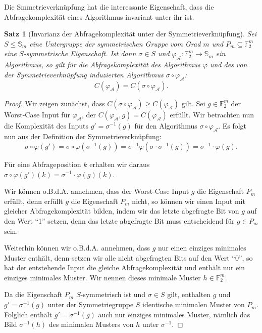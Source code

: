 \documentclass[10pt,a4paper, footheight=1mm]{scrreprt}
\newtheorem{Satz}[definition]{Satz}
\theoremstyle{definition}
\begin{document}
Die Smmetrieverknüpfung hat die interessante Eigenschaft,
dass die Abfragekomplexität eines Algorithmus invariant unter
ihr ist.

\begin{Satz}[Invarianz der Abfragekomplexität unter der Symmetrieverknüpfung]
Sei $S\leq \mathbb{S}_m$ eine Untergruppe der symmetrischen Gruppe vom
Grad $m$ und $P_m \subseteq\mathbb{F}_2^m$ eine $S$-symmetrische
Eigenschaft. Ist dann $\sigma \in S$ und
$\varphi_\mathcal{A}:\mathbb{F}_2^m \to \mathbb{S}_m$ ein Algorithmus,
so gilt für die Abfragekomplexität des Algorithmus $\varphi$
und des von der Symmetrieverknüpfung induzierten Algorithmus
$\sigma \circ \varphi_\mathcal{A}$:
$$C(\varphi_\mathcal{A}) = C(\sigma \circ \varphi_\mathcal{A}).$$
\end{Satz}
\begin{proof}
Wir zeigen zunächst, dass 
$C(\sigma \circ \varphi_\mathcal{A}) \geq C(\varphi_\mathcal{A})$ gilt. 
Sei $g\in\mathbb{F}_2^m$ der Worst-Case Input für $\varphi_\mathcal{A}$,
der $C(\varphi_\mathcal{A}, g) = C(\varphi_\mathcal{A})$ erfüllt.
Wir betrachten nun die Komplexität des Inputs $g' = \sigma^{-1}(g)$
für den Algorithmus $\sigma \circ \varphi_\mathcal{A}$.
Es folgt nun aus der Definition der Symmetrieverknüpfung:
$$ \sigma \circ \varphi (g')
= \sigma \circ \varphi (\sigma^{-1}(g)) 
= \sigma^{-1} \varphi(\sigma \cdot \sigma^{-1} (g))
= \sigma^{-1} \cdot \varphi(g).$$

Für eine Abfrageposition $k$ erhalten wir daraus 
$\sigma \circ \varphi(g')(k) = \sigma^{-1} \cdot \varphi(g)(k)$.

Wir können o.B.d.A. annehmen, dass der Worst-Case Input $g$ die
Eigenschaft $P_m$ erfüllt, denn erfüllt $g$ die Eigenschaft
$P_m$ nicht, so können wir einen Input  mit gleicher
Abfragekomplexität bilden, indem wir das letzte abgefragte
Bit von $g$ auf den Wert "`1"' setzen, denn das letzte
abgefragte Bit muss entscheidend für $g\in P_m$ sein.

Weiterhin können wir o.B.d.A. annehmen, dass $g$ nur 
einen einziges minimales Muster enthält, denn setzen wir
alle nicht abgefragten Bits auf den Wert "`0"', so hat
der entstehende Input die gleiche Abfragekomplexität
und enthält nur ein einziges minimales Muster.
Wir nennen dieses minimale Muster $h\in \mathbb{F}_2^m$.

Da die Eigenschaft $P_m$ $S$-symmetrisch ist und 
$\sigma\in S$ gilt, enthalten $g$ und $g'=\sigma^{-1}(g)$
unter der Symmetriegruppe $S$ identische minimalen Muster von $P_m$.
Folglich enthält $g'=\sigma^{-1}(g)$ auch nur einziges minimales Muster,
nämlich das Bild $\sigma^{-1}(h)$ des minimalen Musters von $h$ unter
$\sigma^{-1}$.


\end{proof}
\end{document}

